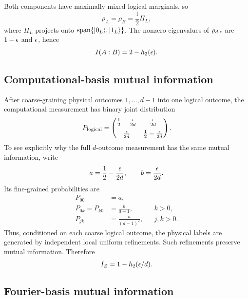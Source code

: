Both components have maximally mixed logical marginals, so
\begin{equation}
\rho_A=\rho_B=\frac12\Pi_L,
\end{equation}
where $\Pi_L$ projects onto $\operatorname{span}\{\lvert 0_L\rangle,\lvert 1_L\rangle\}$. The nonzero eigenvalues of $\rho_{d,\epsilon}$ are $1-\epsilon$ and $\epsilon$, hence
\begin{equation}
I(A:B)=2-h_2(\epsilon).
\end{equation}

\subsection{Computational-basis mutual information}

After coarse-graining physical outcomes $1,\ldots,d-1$ into one logical outcome, the computational measurement has binary joint distribution
\begin{equation}
P_{\rm logical}=
\begin{pmatrix}
\frac12-\frac{\epsilon}{2d} & \frac{\epsilon}{2d}\\[2mm]
\frac{\epsilon}{2d} & \frac12-\frac{\epsilon}{2d}
\end{pmatrix}.
\end{equation}
To see explicitly why the full $d$-outcome measurement has the same mutual information, write
\begin{equation}
 a=\frac12-\frac{\epsilon}{2d},
 \qquad
 b=\frac{\epsilon}{2d}.
\end{equation}
Its fine-grained probabilities are
\begin{align}
P_{00}&=a,\\
P_{0k}=P_{k0}&=\frac{b}{d-1}, && k>0,\\
P_{jk}&=\frac{a}{(d-1)^2}, && j,k>0.
\end{align}
Thus, conditioned on each coarse logical outcome, the physical labels are generated by independent local uniform refinements. Such refinements preserve mutual information. Therefore
\begin{equation}
I_Z=1-h_2(\epsilon/d).
\end{equation}

\subsection{Fourier-basis mutual information}

